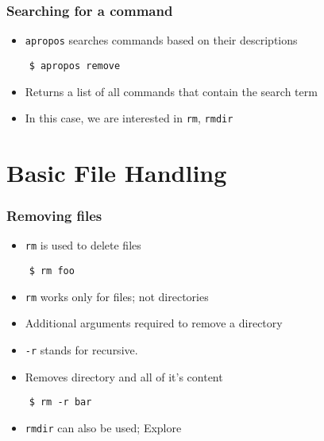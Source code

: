 \documentclass[12pt,compress]{beamer}
\begin{document}
\begin{frame}[fragile]
  \frametitle{Searching for a command}

  \begin{itemize}
  \item \texttt{apropos} searches commands based on their descriptions
  \end{itemize}

  \begin{lstlisting}
    $ apropos remove
  \end{lstlisting} %

  \begin{itemize}
  \item Returns a list of all commands that contain the search term
  \item In this case, we are interested in \texttt{rm}, \texttt{rmdir}
  \end{itemize}
\end{frame}

\section{Basic File Handling}
\begin{frame}[fragile]
  \frametitle{Removing files}

  \begin{itemize}
  \item   \texttt{rm} is used to delete files
  \end{itemize}

  \begin{lstlisting}
    $ rm foo
  \end{lstlisting} %

  \begin{itemize}
  \item \alert{\texttt{rm} works only for files; not directories}
  \end{itemize}

  \begin{itemize}
  \item Additional arguments required to remove a directory 
  \item \texttt{-r} stands for recursive. 
  \item Removes directory and all of it's content 
  \end{itemize}

  \begin{lstlisting}
    $ rm -r bar
  \end{lstlisting} %

  \begin{itemize}
  \item \alert{\texttt{rmdir} can also be used; Explore} 
  \end{itemize}

\end{frame}
\end{document}
